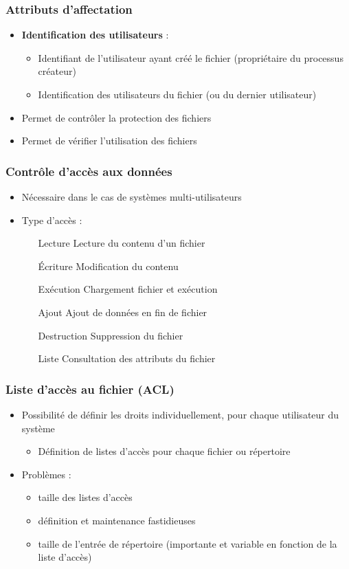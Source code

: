 \begin{frame}
\frametitle{Attributs d'affectation}
\begin{itemize}
\item \textbf{Identification des utilisateurs} :
\begin{itemize}
\item Identifiant de l'utilisateur ayant créé le fichier (propriétaire du processus créateur)
\item Identification des utilisateurs du fichier (ou du dernier utilisateur)
\end{itemize}
\item Permet de contrôler la protection des fichiers
\item Permet de vérifier l'utilisation des fichiers
\end{itemize}
\end{frame}


\begin{frame}
\frametitle{Contrôle d'accès aux données}
\begin{itemize}
\item Nécessaire dans le cas de systèmes multi-utilisateurs
\item Type d'accès :
\begin{itemize}
\item [Lecture] Lecture du contenu d'un fichier
\item [Écriture] Modification du contenu
\item [Exécution] Chargement fichier et exécution
\item [Ajout] Ajout de données en fin de fichier
\item [Destruction] Suppression du fichier
\item [Liste] Consultation des attributs du fichier
\end{itemize}
\end{itemize}
\end{frame}

\begin{frame}
\frametitle{Liste d'accès au fichier (ACL)}
\begin{itemize}
\item Possibilité de définir les droits individuellement, pour chaque utilisateur du système
\begin{itemize}
\item Définition de listes d'accès pour chaque fichier ou répertoire
\end{itemize}
\item Problèmes :
\begin{itemize}
\item taille des listes d'accès
\item définition et maintenance fastidieuses
\item taille de l'entrée de répertoire (importante et variable en fonction de la liste d'accès)
\end{itemize}
\end{itemize}
\end{frame}

